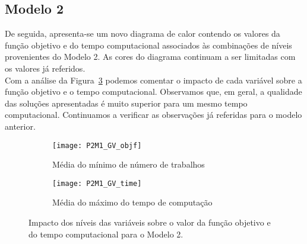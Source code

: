 \subsection{Modelo 2}

De seguida, apresenta-se um novo diagrama de calor contendo os valores da função objetivo e do tempo computacional associados às combinações de níveis provenientes do Modelo 2. As cores do diagrama continuam a ser limitadas com os valores já referidos.\\

Com a análise da Figura~\ref{fig:P2M1_GV} podemos comentar o impacto de cada variável sobre a função objetivo e o tempo computacional. Observamos que, em geral, a qualidade das soluções apresentadas é muito superior para um mesmo tempo computacional. Continuamos a verificar as observações já referidas para o modelo anterior.\\
\begin{figure}[H]
	\centering
	\begin{subfigure}{0.49\textwidth}
	\centering
		\texttt{[image: P2M1\_GV\_objf]}
		\caption{Média do mínimo de número de trabalhos}
		\label{fig:P2M1_GV_objf}
	\end{subfigure}
	\begin{subfigure}{0.49\textwidth}
	\centering
		\texttt{[image: P2M1\_GV\_time]}
		\caption{Média do máximo do tempo de computação}
		\label{fig:P2M1_GV_time}
	\end{subfigure}
	\caption{Impacto dos níveis das variáveis sobre o valor da função objetivo e do tempo computacional para o Modelo 2.}
	\label{fig:P2M1_GV}
\end{figure}

